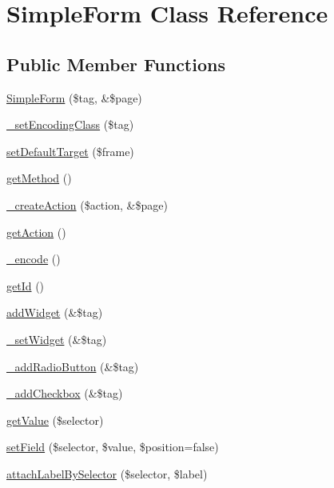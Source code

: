 \hypertarget{class_simple_form}{
\section{SimpleForm Class Reference}
\label{class_simple_form}
}
\subsection*{Public Member Functions}
\begin{DoxyCompactItemize}
\item 
\hyperlink{class_simple_form_a0b5b14841ca19db91ace02f8015da52f}{SimpleForm} (\$tag, \&\$page)
\item 
\hyperlink{class_simple_form_a0aa82cd7ab715d5c6d7de6358a0945e6}{\_\-setEncodingClass} (\$tag)
\item 
\hyperlink{class_simple_form_abe956af62f4b50c7f9a2c7baa4cac055}{setDefaultTarget} (\$frame)
\item 
\hyperlink{class_simple_form_a9a1d22b5a6f9e50cce3a51a0be3a940c}{getMethod} ()
\item 
\hyperlink{class_simple_form_acdee355185aed8489c2f20004248a463}{\_\-createAction} (\$action, \&\$page)
\item 
\hyperlink{class_simple_form_a3a0e6d31118a476bc91c0de7c041a79c}{getAction} ()
\item 
\hyperlink{class_simple_form_af96fd0c11987ec8195b0ac84164483c2}{\_\-encode} ()
\item 
\hyperlink{class_simple_form_a3710801a5f41d259b5b30d64b8c20b67}{getId} ()
\item 
\hyperlink{class_simple_form_add369cd204b2f32106bcaec5023125af}{addWidget} (\&\$tag)
\item 
\hyperlink{class_simple_form_a2e83f01911ebc78292113a0176171793}{\_\-setWidget} (\&\$tag)
\item 
\hyperlink{class_simple_form_a2e1959d83a6d33aa5375686ab45d530f}{\_\-addRadioButton} (\&\$tag)
\item 
\hyperlink{class_simple_form_a40b3b65cc11fa065ca614957b4681cd9}{\_\-addCheckbox} (\&\$tag)
\item 
\hyperlink{class_simple_form_a34b1a1d202d7471801d1afcfe4df6d83}{getValue} (\$selector)
\item 
\hyperlink{class_simple_form_ac4452215cf2bc28e2e5a06e1813162cd}{setField} (\$selector, \$value, \$position=false)
\item 
\hyperlink{class_simple_form_a4e98a18c52653464f565a4f699ecdeaa}{attachLabelBySelector} (\$selector, \$label)

\end{DoxyCompactItemize}
